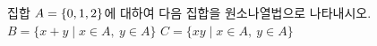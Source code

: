 집합 $A=\{0{,}\mkern3mu\mathopen{}1{,}\mkern3mu\mathopen{}2\}$에 대하여 다음 집합을 원소나열법으로 나타내시오.
 $B=\{x+y \mid x\in A,\ y\in A\}$
 $C=\{xy \mid x\in A,\ y\in A\}$
